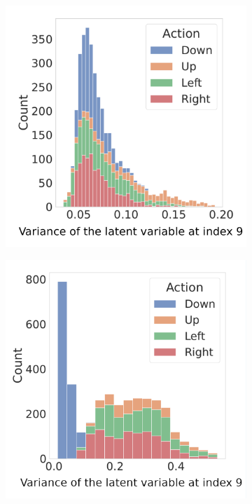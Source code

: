 \documentclass[twoside,11pt]{article}
\begin{document}
\begin{figure}[H]
    \centering
    \begin{subfigure}{.4\textwidth}
        \centering
        \includegraphics[draft=false,width=\linewidth]{cka_figures/chmm_127_Transition_variance}
        \caption{}\label{sfig:cka-trans-chmm-ba}
    \end{subfigure}%
    \begin{subfigure}{.4\textwidth}
        \centering
        \includegraphics[draft=false,width=\linewidth]{cka_figures/chmm_131_Transition_variance}
        \caption{}\label{sfig:cka-trans-chmm-ba}
    \end{subfigure}


\end{figure}
\end{document}
